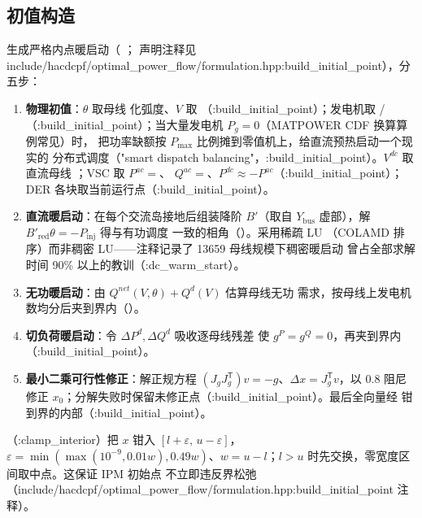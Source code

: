 \subsection{初值构造}

 生成严格内点暖启动（
；
声明注释见 include/hacdcpf/optimal\_power\_flow/formulation.hpp:build\_initial\_point），分五步：

\begin{enumerate}
\item \textbf{物理初值}：$\theta$ 取母线  化弧度、$V$ 取
  （:build\_initial\_point）；发电机取 /
  （:build\_initial\_point）；当大量发电机 $P_g=0$（MATPOWER CDF 换算算例常见）时，
  把功率缺额按 $P_{\max}$ 比例摊到零值机上，给直流预热启动一个现实的
  分布式调度（"smart dispatch balancing"，:build\_initial\_point）。$V^{dc}$ 取
  直流母线 ；VSC 取 $P^{ac}=$、
  $Q^{ac}=$、$P^{dc}\approx-P^{ac}$（:build\_initial\_point）；
  DER 各块取当前运行点（:build\_initial\_point）。
\item \textbf{直流暖启动}：在每个交流岛接地后组装降阶 $B'$（取自
  $Y_{\mathrm{bus}}$ 虚部），解 $B'_{\mathrm{red}}\theta=-P_{\mathrm{inj}}$ 得与有功调度
  一致的相角（）。采用稀疏 LU
  （COLAMD 排序）而非稠密 LU——注释记录了 13659 母线规模下稠密暖启动
  曾占全部求解时间 90\% 以上的教训（:dc\_warm\_start）。
\item \textbf{无功暖启动}：由 $Q^{net}(V,\theta)+Q^d(V)$ 估算母线无功
  需求，按母线上发电机数均分后夹到界内（）。
\item \textbf{切负荷暖启动}：令 $\Delta P^d,\Delta Q^d$ 吸收逐母线残差
  使 $g^P=g^Q=0$，再夹到界内（:build\_initial\_point）。
\item \textbf{最小二乘可行性修正}：解正规方程
  $(J_gJ_g^{\mathsf{T}})v=-g$、$\Delta x=J_g^{\mathsf{T}}v$，以 0.8 阻尼
  修正 $x_0$；分解失败时保留未修正点（:build\_initial\_point）。最后全向量经
   钳到界的内部（:build\_initial\_point）。
\end{enumerate}

（:clamp\_interior）把 $x$ 钳入
$[l+\varepsilon,\,u-\varepsilon]$，$\varepsilon=\min(\max(10^{-9},0.01w),
0.49w)$、$w=u-l$；$l>u$ 时先交换，零宽度区间取中点。这保证 IPM 初始点
不立即违反界松弛（include/hacdcpf/optimal\_power\_flow/formulation.hpp:build\_initial\_point 注释）。

